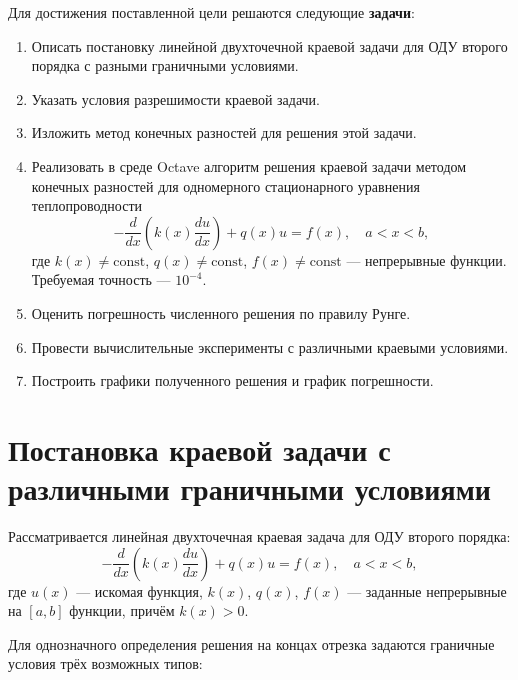 \documentclass[14pt,a4paper]{extarticle}  %
\numberwithin{equation}{section}
\begin{document}
Для достижения поставленной цели решаются следующие \textbf{задачи}:
\begin{enumerate}
    \item Описать постановку линейной двухточечной краевой задачи для ОДУ второго порядка с разными граничными условиями.
    \item Указать условия разрешимости краевой задачи.
    \item Изложить метод конечных разностей для решения этой задачи.
    \item Реализовать в среде Octave алгоритм решения краевой задачи методом конечных разностей для одномерного стационарного уравнения теплопроводности
    \begin{equation*}
        -\frac{d}{dx}\left(k(x)\frac{du}{dx}\right) + q(x)u = f(x), \quad a < x < b,
    \end{equation*}
    где $k(x) \neq \text{const}$, $q(x) \neq \text{const}$, $f(x) \neq \text{const}$ — непрерывные функции. Требуемая точность — $10^{-4}$.
    \item Оценить погрешность численного решения по правилу Рунге.
    \item Провести вычислительные эксперименты с различными краевыми условиями.
    \item Построить графики полученного решения и график погрешности.
\end{enumerate}

\newpage 
\section{Постановка краевой задачи с различными граничными условиями}
Рассматривается линейная двухточечная краевая задача для ОДУ второго порядка:
\begin{equation}
    -\frac{d}{dx}\left(k(x)\frac{du}{dx}\right) + q(x)u = f(x), \quad a < x < b,
    \label{eq:ode_main}
\end{equation}
где $u(x)$ --- искомая функция, $k(x)$, $q(x)$, $f(x)$ --- заданные непрерывные на $[a,b]$ функции, причём $k(x) > 0$.

Для однозначного определения решения на концах отрезка задаются граничные условия трёх возможных типов:
\end{document}
